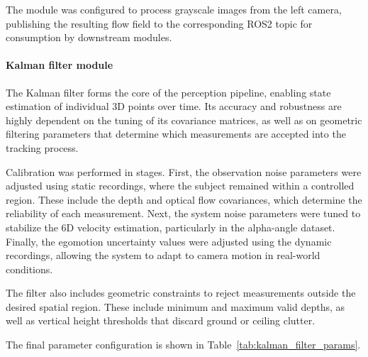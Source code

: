 The module was configured to process grayscale images from the left 
camera, publishing the resulting flow field to the corresponding ROS2 topic 
for consumption by downstream modules.




\paragraph{Kalman filter module}

The Kalman filter forms the core of the perception pipeline, enabling 
state estimation of individual 3D points over time. Its accuracy and 
robustness are highly dependent on the tuning of its covariance matrices, 
as well as on geometric filtering parameters that determine which 
measurements are accepted into the tracking process.

Calibration was performed in stages. First, the observation noise parameters 
were adjusted using static recordings, where the subject remained within a 
controlled region. These include the depth and optical flow covariances, which 
determine the reliability of each measurement. Next, the system noise parameters 
were tuned to stabilize the 6D velocity estimation, particularly in the alpha-angle 
dataset. Finally, the egomotion uncertainty values were adjusted using the 
dynamic recordings, allowing the system to adapt to camera motion in real-world 
conditions.

The filter also includes geometric constraints to reject measurements outside 
the desired spatial region. These include minimum and maximum valid depths, 
as well as vertical height thresholds that discard ground or ceiling clutter.

The final parameter configuration is shown in 
Table~\ref{tab:kalman_filter_params}.

